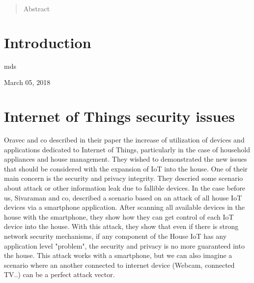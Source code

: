 \documentclass[conference]{IEEEtran}
\begin{document}
\maketitle

\begin{abstract}
Abstract 
\end{abstract}





%
\IEEEpeerreviewmaketitle



\section{Introduction}
\label{sec:Intro}
{}
\hfill mds
 
\hfill March 05, 2018


\section{Internet of Things security issues}

Oravec and co \cite{Oravec2017} described in their paper the increase of utilization of devices and applications dedicated to Internet of Things, particularly in the case of household appliances and house management. They wished to demonstrated the new issues that should be considered with the expansion of IoT into the house. One of their main concern is the security and privacy integrity. They descried some scenario about attack or other information leak due to fallible devices. In the case before us, Sivaraman and co\cite{Sivaraman2016}, described a scenario based on an attack of all house IoT devices via a smartphone application. After scanning all available devices in the house with the smartphone, they show how they can get control of each IoT device into the house. With this attack, they show that even if there is strong network security mechanisms, if any component of the House IoT has any application level "problem", the security and privacy is no more guaranteed into the house. This attack works with a smartphone, but we can also imagine a scenario where an another connected to internet device (Webcam, connected TV..) can be a perfect attack vector. 
\end{document}
